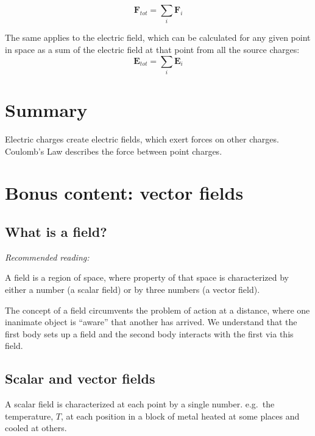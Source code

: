 \documentclass[
  letterpaper,
  DIV=11,
  numbers=noendperiod]{scrreprt}
\begin{document}
\[ \mathrm{\mathbf{F}}_{tot} = \sum_i \mathrm{\mathbf{F}}_i \]

The same applies to the electric field, which can be calculated for any
given point in space as a sum of the electric field at that point from
all the source charges:
\[ \mathrm{\mathbf{E}}_{tot} = \sum_i \mathrm{\mathbf{E}}_i \]

\section{Summary}\label{summary}

Electric charges create electric fields, which exert forces on other
charges. Coulomb's Law describes the force between point charges.

\section{Bonus content: vector
fields}\label{bonus-content-vector-fields}

\subsection{What is a field?}\label{what-is-a-field}

\emph{Recommended reading:}

A field is a region of space, where property of that space is
characterized by either a number (a scalar field) or by three numbers (a
vector field).

The concept of a field circumvents the problem of action at a distance,
where one inanimate object is ``aware'' that another has arrived. We
understand that the first body sets up a field and the second body
interacts with the first via this field.

\subsection{Scalar and vector fields}\label{scalar-and-vector-fields}

A scalar field is characterized at each point by a single number.
e.g.~the temperature, \(T\), at each position in a block of metal heated
at some places and cooled at others.
\end{document}
